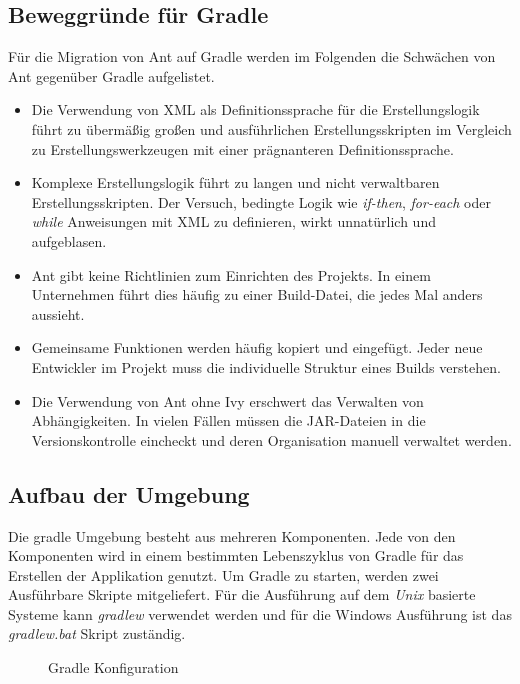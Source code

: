 \subsection{Beweggründe für Gradle}
Für die Migration von Ant auf Gradle werden im Folgenden die Schwächen von Ant gegenüber Gradle aufgelistet.
\begin{itemize}
  \item Die Verwendung von XML als Definitionssprache für die Erstellungslogik führt zu übermäßig großen und ausführlichen Erstellungsskripten im Vergleich zu Erstellungswerkzeugen mit einer prägnanteren Definitionssprache. \cite{muschko2014gradle}
  \item Komplexe Erstellungslogik führt zu langen und nicht verwaltbaren Erstellungsskripten. Der Versuch, bedingte Logik wie \textit{if-then}, \textit{for-each} oder \textit{while} Anweisungen mit XML zu definieren, wirkt unnatürlich und aufgeblasen.\cite{muschko2014gradle}
  \item Ant gibt keine Richtlinien zum Einrichten des Projekts. In einem Unternehmen führt dies häufig zu einer Build-Datei, die jedes Mal anders aussieht.\cite{berglund2011building}
  \item Gemeinsame Funktionen werden häufig kopiert und eingefügt. Jeder neue Entwickler im Projekt muss die individuelle Struktur eines Builds verstehen.\cite{varanasi2015introducing}
  \item Die Verwendung von Ant ohne Ivy erschwert das Verwalten von Abhängigkeiten. In vielen Fällen müssen die JAR-Dateien in die Versionskontrolle eincheckt und deren Organisation manuell verwaltet werden.\cite{varanasi2015introducing}
\end{itemize}

\subsection{Aufbau der Umgebung}
  Die gradle Umgebung besteht aus mehreren Komponenten. Jede von den Komponenten wird in einem bestimmten Lebenszyklus von Gradle für das Erstellen der Applikation genutzt.\newline
  Um Gradle zu starten, werden zwei Ausführbare Skripte mitgeliefert. Für die Ausführung auf dem \textit{Unix} basierte Systeme kann \textit{gradlew} verwendet werden und für die Windows Ausführung ist das \textit{gradlew.bat} Skript zuständig.\bigbreak
  \begin{figure}[h!]
    \centering
    \begin{minipage}{7cm}
    \end{minipage}
    \caption{Gradle Konfiguration \cite{gradleStructure}}
    \label{fig:gradle_project_structure}
  \end{figure}

